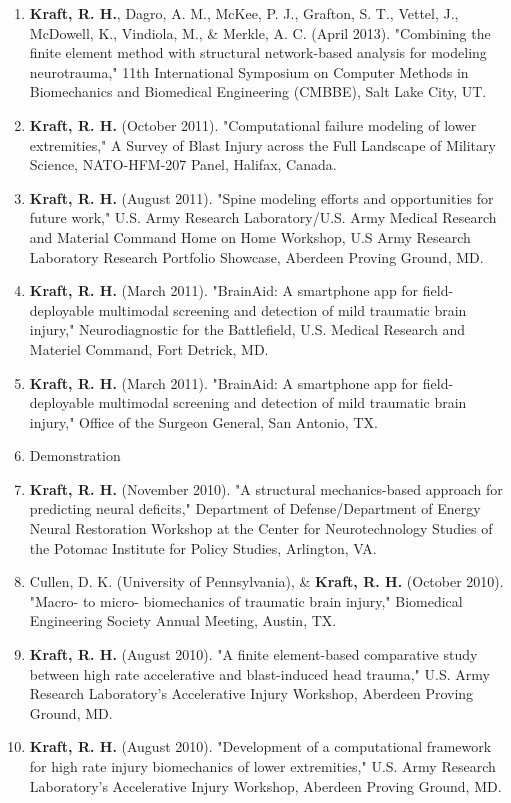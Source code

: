 \documentclass[a4paper,10pt]{article}
\begin{document}
\begin{enumerate}
  \item \textbf{\textbf{Kraft,} R. H.}, Dagro, A. M., McKee, P. J., Grafton, S. T., Vettel, J., McDowell, K., Vindiola, M., \&
 Merkle, A. C. (April 2013). "Combining the finite element method with structural network-based analysis for modeling neurotrauma," 11th International Symposium on Computer Methods in Biomechanics and Biomedical Engineering (CMBBE), Salt Lake City, UT.
  \item \textbf{\textbf{Kraft,} R. H.} (October 2011). "Computational failure modeling of lower extremities," A Survey of Blast Injury across the Full Landscape of Military Science, NATO-HFM-207 Panel, Halifax, Canada.
  \item \textbf{\textbf{Kraft,} R. H.} (August 2011). "Spine modeling efforts and opportunities for future work," U.S. Army Research Laboratory/U.S. Army Medical Research and Material Command Home on Home Workshop, U.S Army Research Laboratory Research Portfolio Showcase, Aberdeen Proving Ground, MD.
  \item \textbf{\textbf{Kraft,} R. H.} (March 2011). "BrainAid: A smartphone app for field-deployable multimodal screening and detection of mild traumatic brain injury," Neurodiagnostic for the Battlefield, U.S. Medical Research and Materiel Command, Fort Detrick, MD.
  \item \textbf{\textbf{Kraft,} R. H.} (March 2011). "BrainAid: A smartphone app for field-deployable multimodal screening and detection of mild traumatic brain injury," Office of the Surgeon General, San Antonio, TX.
  \item Demonstration
  \item \textbf{\textbf{Kraft,} R. H.} (November 2010). "A structural mechanics-based approach for predicting neural deficits," Department of Defense/Department of Energy Neural Restoration Workshop at the Center for Neurotechnology Studies of the Potomac Institute for Policy Studies, Arlington, VA.
  \item Cullen, D. K. (University of Pennsylvania), \&
 \textbf{\textbf{Kraft,} R. H.} (October 2010). "Macro- to micro- biomechanics of traumatic brain injury," Biomedical Engineering Society Annual Meeting, Austin, TX.
  \item \textbf{\textbf{Kraft,} R. H.} (August 2010). "A finite element-based comparative study between high rate accelerative and blast-induced head trauma," U.S. Army Research Laboratory's Accelerative Injury Workshop, Aberdeen Proving Ground, MD.
  \item \textbf{\textbf{Kraft,} R. H.} (August 2010). "Development of a computational framework for high rate injury biomechanics of lower extremities," U.S. Army Research Laboratory's Accelerative Injury Workshop, Aberdeen Proving Ground, MD.

\end{enumerate}
\end{document}
